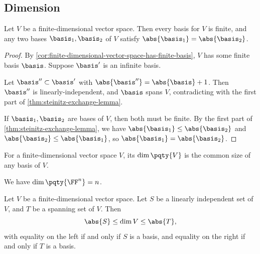 \subsection{Dimension}

\begin{corollary}
    \label{cor:basis-of-finite-dimensional-vector-space}%
    Let \(V\) be a finite-dimensional vector space. Then every basis for \(V\) is finite, and any two bases \(\basis_1, \basis_2\) of \(V\) satisfy \(\abs{\basis_1} = \abs{\basis_2}\).
\end{corollary}

\begin{proof}
    By \autoref{cor:finite-dimensional-vector-space-has-finite-basis}, \(V\) has some finite basis \(\basis\). Suppose \(\basis'\) is an infinite basis.

    Let \(\basis'' \subset \basis'\) with \(\abs{\basis''} = \abs{\basis} + 1\). Then \(\basis''\) is linearly-independent, and \(\basis\) spans \(V\), contradicting with the first part of \autoref{thm:steinitz-exchange-lemma}.

    If \(\basis_1, \basis_2\) are bases of \(V\), then both must be finite. By the first part of \autoref{thm:steinitz-exchange-lemma}, we have \(\abs{\basis_1} \leq \abs{\basis_2}\) and \(\abs{\basis_2} \leq \abs{\basis_1}\), so \(\abs{\basis_1} = \abs{\basis_2}\).
\end{proof}

\begin{definition}[Dimension]
    For a finite-dimensional vector space \(V\), its  \(\dim\pqty{V}\) is the common size of any basis of \(V\).
\end{definition}

\begin{example}
    We have \(\dim\pqty{\FF^n} = n\).
\end{example}

\begin{corollary}
    \label{cor:size-of-li-and-spanning}%
    Let \(V\) be a finite-dimensional vector space. Let \(S\) be a linearly independent set of \(V\), and \(T\) be a spanning set of \(V\). Then
    \[
        \abs{S} \leq \dim V \leq \abs{T},
    \]
    with equality on the left if and only if \(S\) is a basis, and equality on the right if and only if \(T\) is a basis.
\end{corollary}

